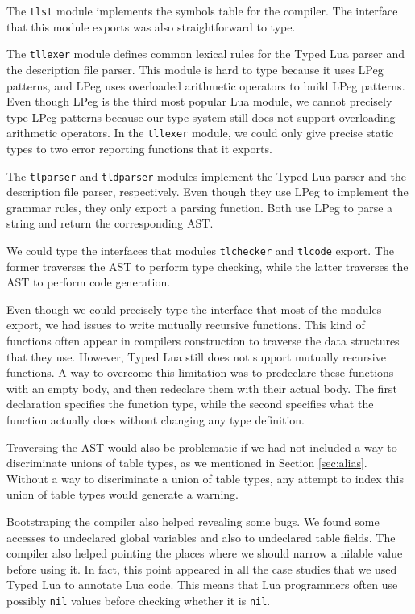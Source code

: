 The \texttt{tlst} module implements the symbols table for the compiler.
The interface that this module exports was also straightforward to type.

The \texttt{tllexer} module defines common lexical rules for
the Typed Lua parser and the description file parser.
This module is hard to type because it uses LPeg \cite{lpeg,ierusalimschy2009lpeg}
patterns, and LPeg uses overloaded arithmetic operators to
build LPeg patterns. 
Even though LPeg is the third most popular Lua module,
we cannot precisely type LPeg patterns because our
type system still does not support overloading arithmetic
operators.
In the \texttt{tllexer} module, we could only give precise static types
to two error reporting functions that it exports.

The \texttt{tlparser} and \texttt{tldparser} modules implement the Typed Lua
parser and the description file parser, respectively.
Even though they use LPeg to implement the grammar rules,
they only export a parsing function.
Both use LPeg to parse a string and return the corresponding AST.

We could type the interfaces that modules \texttt{tlchecker} and
\texttt{tlcode} export.
The former traverses the AST to perform type checking,
while the latter traverses the AST to perform code generation.

Even though we could precisely type the interface that most of
the modules export, we had issues to write mutually recursive functions.
This kind of functions often appear in compilers construction
to traverse the data structures that they use.
However, Typed Lua still does not support mutually recursive functions.
A way to overcome this limitation was to predeclare these functions
with an empty body, and then redeclare them with their actual body.
The first declaration specifies the function type, while the
second specifies what the function actually does without changing
any type definition.

Traversing the AST would also be problematic if we had not included
a way to discriminate unions of table types, as we mentioned in Section \ref{sec:alias}.
Without a way to discriminate a union of table types, any attempt
to index this union of table types would generate a warning.

Bootstraping the compiler also helped revealing some bugs.
We found some accesses to undeclared global variables and also
to undeclared table fields.
The compiler also helped pointing the places where we should narrow
a nilable value before using it.
In fact, this point appeared in all the case studies that we used
Typed Lua to annotate Lua code.
This means that Lua programmers often use possibly \texttt{nil} values
before checking whether it is \texttt{nil}.

